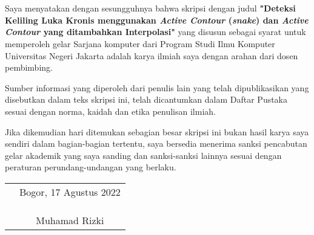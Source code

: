 \chapter*{}

Saya menyatakan dengan sesungguhnya bahwa skripsi dengan judul 	\textbf{"Deteksi Keliling Luka Kronis menggunakan \emph{Active Contour} (\emph{snake}) dan \emph{Active Contour} yang ditambahkan Interpolasi"} yang disusun sebagai syarat untuk memperoleh gelar Sarjana komputer dari Program Studi Ilmu Komputer Universitas Negeri Jakarta adalah karya ilmiah saya dengan arahan dari dosen pembimbing.

Sumber informasi yang diperoleh dari penulis lain yang
telah dipublikasikan yang disebutkan dalam teks skripsi ini, telah dicantumkan dalam Daftar Pustaka sesuai dengan norma, kaidah dan etika penulisan ilmiah.

Jika dikemudian hari ditemukan sebagian besar skripsi ini bukan hasil karya saya sendiri dalam bagian-bagian tertentu, saya bersedia menerima sanksi pencabutan gelar akademik yang saya sanding dan sanksi-sanksi lainnya sesuai dengan peraturan perundang-undangan yang berlaku.

\vspace{.5cm}

\begin{tabular}{p{7.5cm}c}
	&Bogor, 17 Agustus 2022\\
	&\\
	&\\
	&\\
	&Muhamad Rizki
\end{tabular}